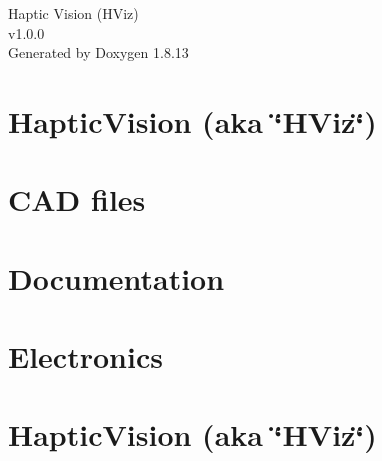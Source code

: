 \documentclass[twoside]{book}
\newcommand{\+}{\discretionary{\mbox{\scriptsize$\hookleftarrow$}}{}{}}
\newcommand{\clearemptydoublepage}{%
  \newpage{\pagestyle{empty}\cleardoublepage}%
}
\begin{document}
\hypersetup{pageanchor=false,
             bookmarksnumbered=true,
             pdfencoding=unicode
            }
\begin{titlepage}
\vspace*{7cm}
\begin{center}%
{\Large Haptic Vision (H\+Viz) \\[1ex]\large v1.\+0.\+0 }\\
\vspace*{1cm}
{\large Generated by Doxygen 1.8.13}\\
\end{center}
\end{titlepage}
\clearemptydoublepage
{}
\tableofcontents
\clearemptydoublepage
{}
\hypersetup{pageanchor=true}

\chapter{Haptic\+Vision (aka \char`\"{}\+H\+Viz\char`\"{})}
\label{index}\hypertarget{index}{}
\chapter{C\+AD files}
\label{md__home_joseph_hviz_joel_ss_extras_CAD_files_README}

\chapter{Documentation}
\label{md__home_joseph_hviz_joel_ss_extras_Documentation_README}

\chapter{Electronics}
\label{md__home_joseph_hviz_joel_ss_extras_Electronics_README}

\chapter{Haptic\+Vision (aka \char`\"{}\+H\+Viz\char`\"{})}
\label{md__home_joseph_hviz_joel_ss_extras_General_README}

\end{document}
